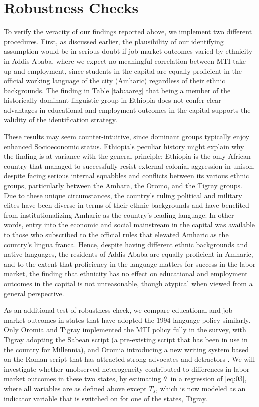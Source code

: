 
\section{Robustness Checks}
\label{section:robustness}

To verify the veracity of our findings reported above, we implement two different procedures. First, as discussed earlier, the plausibility of our identifying assumption would be in serious doubt if job market outcomes varied by ethnicity in Addis Ababa, where we expect no meaningful correlation between MTI take-up and employment, since students in the capital are equally proficient in the official working language of the city (Amharic) regardless of their ethnic backgrounds. The finding in Table \ref{tab:aareg} that being a member of the historically dominant linguistic group in Ethiopia does not confer clear advantages in educational and employment outcomes in the capital supports the validity of the identification strategy. 

These results may seem counter-intuitive, since dominant groups typically enjoy enhanced Socioeconomic status. Ethiopia's peculiar history might explain why the finding is at variance with the general principle: Ethiopia is the only African country that managed to successfully resist external colonial aggression in unison, despite facing serious internal squabbles and conflicts between its various ethnic groups, particularly between the Amhara, the Oromo, and the Tigray groups. Due to these unique circumstances, the country's ruling political and military elites have been diverse in terms of their ethnic backgrounds and have benefited from institutionalizing Amharic as the country's leading language. In other words, entry into the economic and social mainstream in the capital was available to those who subscribed to the official rules that elevated Amharic as the country's lingua franca. Hence, despite having different ethnic backgrounds and native languages, the residents of Addis Ababa are equally proficient in Amharic, and to the extent that proficiency in the language matters for success in the labor market, the finding that ethnicity has no effect on educational and employment outcomes in the capital is not unreasonable, though atypical when viewed from a general perspective.

As an additional test of robustness check, we compare educational and job market outcomes in states that have adopted the 1994 language policy similarly. Only Oromia and Tigray implemented the MTI policy fully in the survey, with Tigray adopting the Sabean script (a pre-existing script that has been in use in the country for Millennia), and Oromia introducing a new writing system based on the Roman script that has attracted strong advocates and detractors \citep{chicoine_schooling_2019}. We will investigate whether unobserved heterogeneity contributed to differences in labor market outcomes in these two states, by estimating  $\theta\ $ in a regression of \eqref{eq:03}, where all variables are as defined above except $ T_{s} $, which is now modeled as an indicator variable that is switched on for one of the states, Tigray.  

